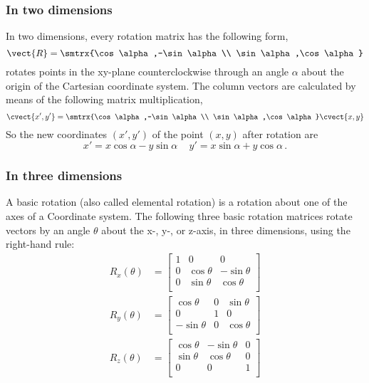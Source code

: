 \subsubsection{In two dimensions}
In two dimensions, every rotation matrix has the following form,
\[ \vect{R}=\smtrx{\cos\alpha,-\sin\alpha\\ \sin\alpha,\cos\alpha} \]
rotates points in the xy-plane counterclockwise through an angle $\alpha$ about the origin of the Cartesian coordinate system. The column vectors are calculated by means of the following matrix multiplication,
\begin{equation*}
\cvect{x',y'}=\smtrx{\cos\alpha,-\sin\alpha\\ \sin\alpha,\cos\alpha}\cvect{x,y}
\end{equation*}
So the new coordinates $\left( x',y' \right)$ of the point $\left( x,y \right)$ after rotation are
\[
 x'=x\cos \alpha -y\sin \alpha \, \quad
 y'=x\sin \alpha +y\cos \alpha \,.
\]
\subsubsection{In three dimensions}
A basic rotation (also called elemental rotation) is a rotation about one of the axes of a Coordinate system. The following three basic rotation matrices rotate vectors by an angle $\theta$ about the x-, y-, or z-axis, in three dimensions, using the right-hand rule:
\[ {\begin{alignedat}{1}R_{x}(\theta )&={\begin{bmatrix}1&0&0\\0&\cos \theta &-\sin \theta \\[3pt]0&\sin \theta &\cos \theta \\[3pt]\end{bmatrix}}\\[6pt]R_{y}(\theta )&={\begin{bmatrix}\cos \theta &0&\sin \theta \\[3pt]0&1&0\\[3pt]-\sin \theta &0&\cos \theta \\\end{bmatrix}}\\[6pt]R_{z}(\theta )&={\begin{bmatrix}\cos \theta &-\sin \theta &0\\[3pt]\sin \theta &\cos \theta &0\\[3pt]0&0&1\\\end{bmatrix}}\end{alignedat}}\]


